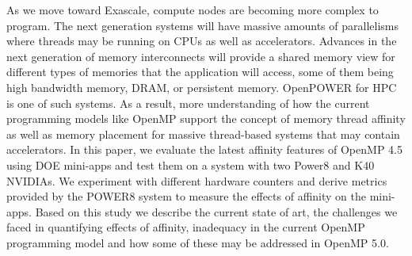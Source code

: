 As we move toward Exascale, compute nodes are becoming more complex to program.
The next generation systems will have massive amounts of parallelisms where threads 
may be running on CPUs as well as accelerators. Advances in the next generation of memory interconnects
will provide a shared memory view for different types of memories that the application will access, some of them
being high bandwidth memory, DRAM, or persistent memory. OpenPOWER for HPC is one of such systems.
As a result, more understanding of how the current programming models like OpenMP support
the concept of memory thread affinity as well as memory placement for massive thread-based systems that may contain accelerators. 
In this paper, we evaluate the latest affinity features of OpenMP 4.5 using DOE mini-apps 
and test them on a system with two Power8 and K40 NVIDIAs. We experiment with different hardware counters  and derive metrics provided by the POWER8 system to measure the effects of affinity on the mini-apps. Based on this study we describe the current state of art, the challenges we faced in quantifying effects of affinity, inadequacy in the current OpenMP programming model and how some of these may be addressed in OpenMP 5.0.